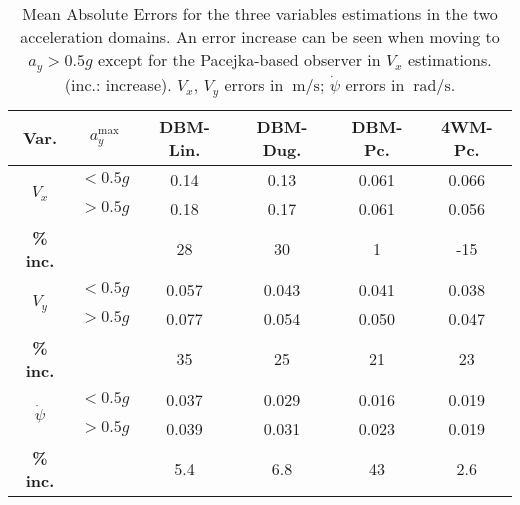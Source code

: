 \documentclass[journal]{IEEEtran}
\begin{document}
\begin{table}[h]

\centering
\caption{Mean Absolute Errors for the three variables estimations in the two acceleration domains. An error increase can be seen when moving to $a_y>0.5g$ except for the Pacejka-based observer in $V_x$ estimations. (inc.: increase). $V_x$, $V_y$ errors in $\SI{}{\meter\per\second}$; $\dot\psi$ errors in $\SI{}{\radian\per\second}$.}
\begin{tabular}{cccccc}
\toprule
\textbf{Var.} & $a_y^{\text{max}}$ & \textbf{DBM-Lin.} & \textbf{DBM-Dug.} & \textbf{DBM-Pc.} & \textbf{4WM-Pc.}\\
\midrule
\multirow{2}{*}{$V_x$} & $<0.5g$  & 0.14 & 0.13 & 0.061 & 0.066 \\ 
\cmidrule{2-6}
& $>0.5g$ & 0.18 & 0.17 & 0.061 & 0.056 \\
\cmidrule{2-6}
\textbf{\% inc.} & & 28 & 30 & 1 & -15\\
\midrule
\multirow{2}{*}{$V_y$} &  $<0.5g$ & 0.057 & 0.043 & 0.041  & 0.038\\
\cmidrule{2-6}
& $>0.5g$ & 0.077 & 0.054 & 0.050 & 0.047 \\
\cmidrule{2-6}
\textbf{\% inc.} & & 35 & 25 & 21 & 23 \\
\midrule
\multirow{2}{*}{$\dot{\psi}$} & $<0.5g$ & 0.037 & 0.029 & 0.016 & 0.019 \\
\cmidrule{2-6}
& $>0.5g$ & 0.039 & 0.031 & 0.023 & 0.019 \\
\cmidrule{2-6}
\textbf{\% inc.} & & 5.4 & 6.8 & 43 & 2.6\\
\bottomrule
\end{tabular}

\label{obsComp.tab}
\end{table}

\end{document}

